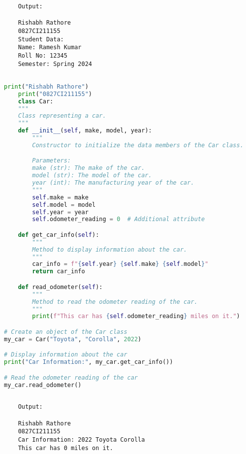 \documentclass{report}
\begin{document}
\begin{verbatim}
	Output:

	Rishabh Rathore
	0827CI211155
	Student Data:
	Name: Ramesh Kumar
	Roll No: 12345
	Semester: Spring 2024
	

\end{verbatim}

\newpage


\sol 
\begin{lstlisting}[language=Python]
	print("Rishabh Rathore")
	print("0827CI211155")
	class Car:
    """
    Class representing a car.
    """
    def __init__(self, make, model, year):
        """
        Constructor to initialize the data members of the Car class.

        Parameters:
        make (str): The make of the car.
        model (str): The model of the car.
        year (int): The manufacturing year of the car.
        """
        self.make = make
        self.model = model
        self.year = year
        self.odometer_reading = 0  # Additional attribute

    def get_car_info(self):
        """
        Method to display information about the car.
        """
        car_info = f"{self.year} {self.make} {self.model}"
        return car_info

    def read_odometer(self):
        """
        Method to read the odometer reading of the car.
        """
        print(f"This car has {self.odometer_reading} miles on it.")

# Create an object of the Car class
my_car = Car("Toyota", "Corolla", 2022)

# Display information about the car
print("Car Information:", my_car.get_car_info())

# Read the odometer reading of the car
my_car.read_odometer()
  

\end{lstlisting}

\begin{verbatim}
	Output:

	Rishabh Rathore
	0827CI211155
	Car Information: 2022 Toyota Corolla
	This car has 0 miles on it.
	

\end{verbatim}

\newpage
\end{document}
